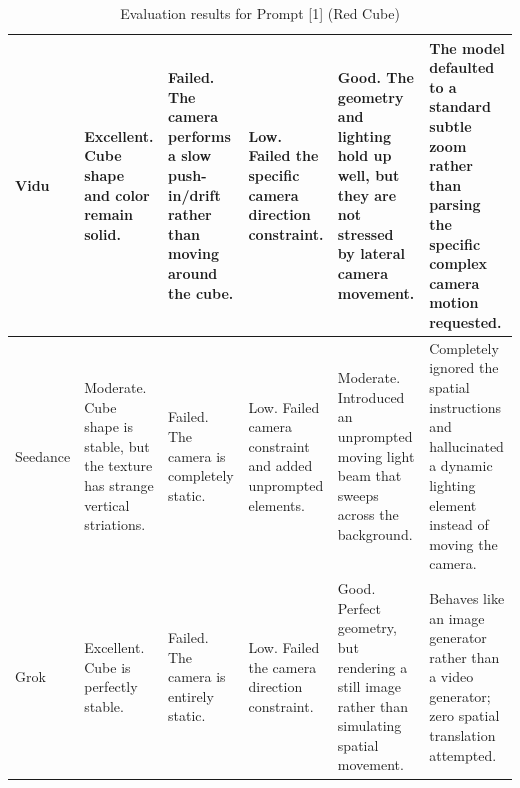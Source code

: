 \documentclass[sigconf]{acmart}
\begin{document}
\begin{table}[H]
\begin{tabularx}{\textwidth}{| l | >{\raggedright\arraybackslash}X | >{\raggedright\arraybackslash}X | >{\raggedright\arraybackslash}X | >{\raggedright\arraybackslash}X | >{\raggedright\arraybackslash}X |}
        Vidu           & Excellent. Cube shape and color remain solid.                                    & Failed. The camera performs a slow push-in/drift rather than moving around the cube. & Low. Failed the specific camera direction constraint.                                            & Good. The geometry and lighting hold up well, but they are not stressed by lateral camera movement.   & The model defaulted to a standard subtle zoom rather than parsing the specific complex camera motion requested.                 \\ \hline
        Seedance       & Moderate. Cube shape is stable, but the texture has strange vertical striations. & Failed. The camera is completely static.                                             & Low. Failed camera constraint and added unprompted elements.                                     & Moderate. Introduced an unprompted moving light beam that sweeps across the background.               & Completely ignored the spatial instructions and hallucinated a dynamic lighting element instead of moving the camera.           \\ \hline
        Grok           & Excellent. Cube is perfectly stable.                                             & Failed. The camera is entirely static.                                               & Low. Failed the camera direction constraint.                                                     & Good. Perfect geometry, but rendering a still image rather than simulating spatial movement.          & Behaves like an image generator rather than a video generator; zero spatial translation attempted.                              \\ \hline
    \end{tabularx}
    \caption{Evaluation results for Prompt [1] (Red Cube)}
    \label{tab:redcube}
\end{table}
\end{document}
